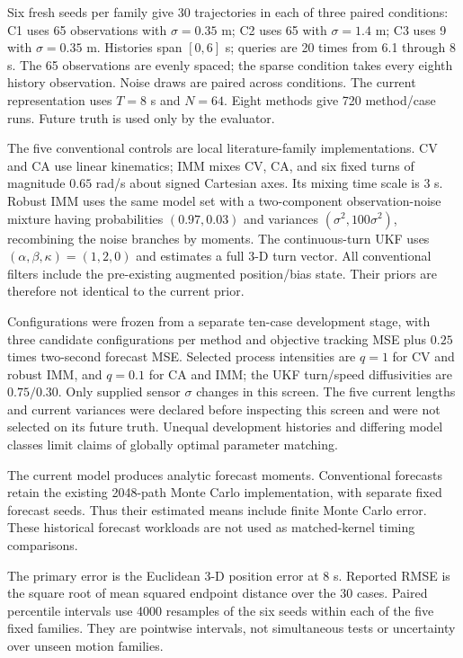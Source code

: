 \documentclass[journal]{IEEEtran}
\begin{document}
Six fresh seeds per family give 30 trajectories in each of three paired
conditions: C1 uses 65 observations with $\sigma=0.35$ m; C2 uses 65 with
$\sigma=1.4$ m; C3 uses 9 with $\sigma=0.35$ m. Histories span $[0,6]$ s;
queries are 20 times from 6.1 through 8 s. The 65 observations are evenly
spaced; the sparse condition takes every eighth history observation.
Noise draws are paired across conditions. The current representation
uses $T=8$ s and $N=64$. Eight methods give 720 method/case runs.
Future truth is used only by the evaluator.

The five conventional controls are local literature-family
implementations. CV and CA use linear kinematics; IMM mixes CV, CA,
and six fixed turns of magnitude $0.65$ rad/s about signed Cartesian
axes. Its mixing time scale is 3 s. Robust IMM uses the same model set
with a two-component observation-noise mixture having probabilities
$(0.97,0.03)$ and variances $(\sigma^2,100\sigma^2)$, recombining the
noise branches by moments. The continuous-turn UKF uses
$(\alpha,\beta,\kappa)=(1,2,0)$ and estimates a full 3-D turn vector.
All conventional filters include the pre-existing augmented position/bias
state. Their priors are therefore not identical to the current prior.

Configurations were frozen from a separate ten-case development stage,
with three candidate configurations per method and objective tracking
MSE plus $0.25$ times two-second forecast MSE. Selected process
intensities are $q=1$ for CV and robust IMM, and $q=0.1$ for CA and IMM;
the UKF turn/speed diffusivities are $0.75/0.30$. Only supplied sensor
$\sigma$ changes in this screen. The five current lengths and current
variances were declared before inspecting this screen and were not
selected on its future truth. Unequal development histories and differing
model classes limit claims of globally optimal parameter matching.

The current model produces analytic forecast moments. Conventional
forecasts retain the existing 2048-path Monte Carlo implementation, with
separate fixed forecast seeds. Thus their estimated means include finite
Monte Carlo error. These historical forecast workloads are not used as
matched-kernel timing comparisons.

The primary error is the Euclidean 3-D position error at 8 s. Reported
RMSE is the square root of mean squared endpoint distance over the 30
cases. Paired percentile intervals use 4000 resamples of the six seeds
within each of the five fixed families. They are pointwise intervals,
not simultaneous tests or uncertainty over unseen motion families.
\end{document}

